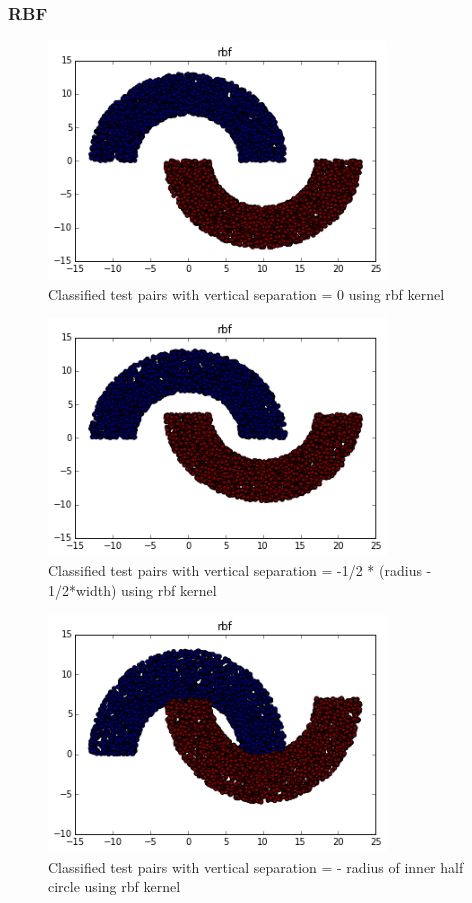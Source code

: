 \documentclass[paper=a4, fontsize=11pt]{scrartcl} %
\numberwithin{equation}{section} %
\numberwithin{figure}{section} %
\numberwithin{table}{section} %
\begin{document}
\subsubsection{RBF}
\begin{figure}[H]
	\centering
  \includegraphics[width=0.8\textwidth]{rbf_1.png}
	\caption{Classified test pairs with vertical separation = 0 using rbf kernel}
	\label{fig_rbf1}
\end{figure}
\begin{figure}[H]
	\centering
  \includegraphics[width=0.8\textwidth]{rbf_2.png}
	\caption{Classified test pairs with vertical separation = -1/2 * (radius - 1/2*width) using rbf kernel}
	\label{fig_rbf2}
\end{figure}
\begin{figure}[H]
	\centering
  \includegraphics[width=0.8\textwidth]{rbf_3.png}
	\caption{Classified test pairs with vertical separation = - radius of inner half circle using rbf kernel}
	\label{fig_rbf3}
\end{figure}
\end{document}
